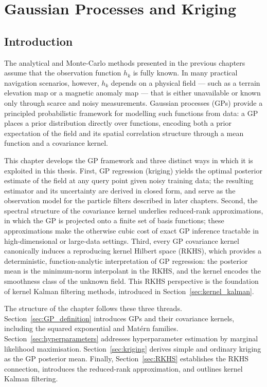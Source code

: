 \chapter{Gaussian Processes and Kriging}

\vfill
\localtableofcontents
\vfill
\newpage\label{sec:GP}

\section{Introduction}

The analytical and Monte-Carlo methods presented in the previous chapters
assume that the observation function $h_k$ is fully known. In many practical
navigation scenarios, however, $h_k$ depends on a physical field --- such as
a terrain elevation map or a magnetic anomaly map --- that is either unavailable
or known only through scarce and noisy measurements. Gaussian processes (GPs)
provide a principled probabilistic framework for modelling such functions from
data: a GP places a prior distribution directly over functions, encoding both a
prior expectation of the field and its spatial correlation structure through a
mean function and a covariance kernel.

This chapter develops the GP framework and three distinct ways in which it is
exploited in this thesis. First, GP regression (kriging) yields the optimal
posterior estimate of the field at any query point given noisy training data;
the resulting estimator and its uncertainty are derived in closed form, and serve
as the observation model for the particle filters described in later chapters.
Second, the spectral structure of the covariance kernel underlies reduced-rank
approximations, in which the GP is projected onto a finite set of basis
functions; these approximations make the otherwise cubic cost of exact GP
inference tractable in high-dimensional or large-data settings. Third, every GP
covariance kernel canonically induces a reproducing kernel Hilbert space (RKHS),
which provides a deterministic, function-analytic interpretation of GP
regression: the posterior mean is the minimum-norm interpolant in the RKHS, and
the kernel encodes the smoothness class of the unknown field. This RKHS
perspective is the foundation of kernel Kalman filtering methods, introduced in
Section~\ref{sec:kernel_kalman}.

The structure of the chapter follows these three threads. Section~\ref{sec:GP_definition}
introduces GPs and their covariance kernels, including the squared exponential
and Mat\'{e}rn families. Section~\ref{sec:hyperparameters} addresses hyperparameter
estimation by marginal likelihood maximisation. Section~\ref{sec:kriging}
derives simple and ordinary kriging as the GP posterior mean. Finally,
Section~\ref{sec:RKHS} establishes the RKHS connection, introduces the
reduced-rank approximation, and outlines kernel Kalman filtering.

